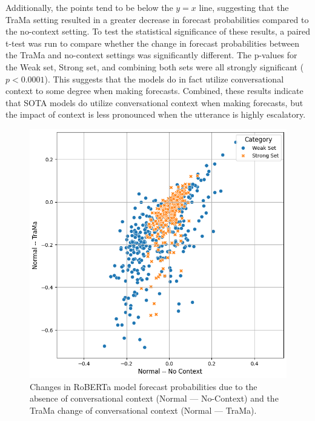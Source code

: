 Additionally, the points tend to be below the $y=x$ line, suggesting that the TraMa setting resulted in a greater decrease in forecast probabilities compared to the no-context setting. 
To test the statistical significance of these results, a paired t-test was run to compare whether the change in forecast probabilities between the TraMa and no-context settings was significantly different.
The p-values for the Weak set, Strong set, and combining both sets were all strongly significant ($p < 0.0001$). 
This suggests that the models do in fact utilize conversational context to some degree when making forecasts. 
Combined, these results indicate that SOTA models do utilize conversational context when making forecasts, but the impact of context is less pronounced when the utterance is highly escalatory.

\begin{figure}[ht]
    \centering
    \includegraphics[width=\linewidth]{figures/trama_results.png}
    \caption{
        Changes in RoBERTa model forecast probabilities due to the absence of conversational context (Normal --- No-Context) and the TraMa change of conversational context (Normal --- TraMa).}
    \label{fig:trama-results}
\end{figure}